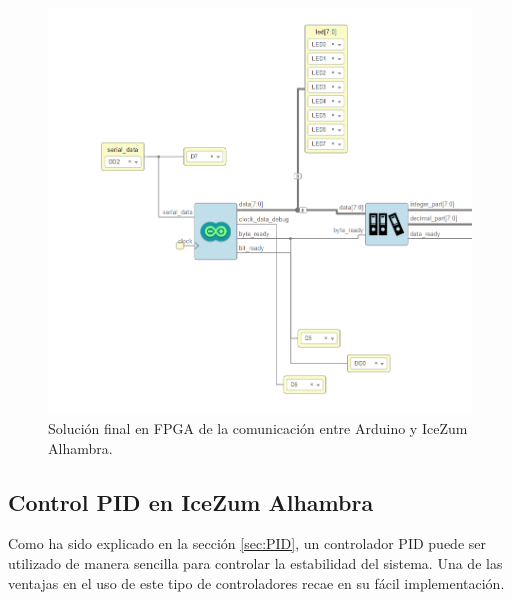 \begin{figure}[H]
	\center
	\includegraphics[scale=0.6]{imagenes/Balancing_robot/arduino_arrange.PNG}
	\caption{Solución final en FPGA de la comunicación entre Arduino y IceZum Alhambra.}
	\label{fig:arduino_arrange}
\end{figure}




\subsection{Control PID en IceZum Alhambra}
Como ha sido explicado en la sección \ref{sec:PID}, un controlador PID puede ser utilizado de manera sencilla para controlar la estabilidad del sistema. \newline
Una de las ventajas en el uso de este tipo de controladores recae en su fácil implementación.
